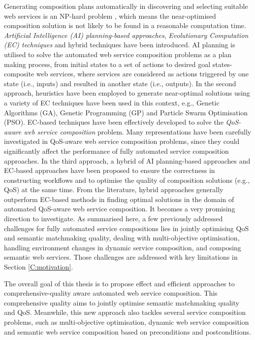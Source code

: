 Generating composition plans automatically in discovering and selecting suitable web services is an NP-hard problem \cite{moghaddam2014service}, which means the near-optimised composition solution is not likely to be found in a reasonable computation time. \emph{Artificial Intelligence (AI) planning-based approaches}, \emph{Evolutionary Computation (EC) techniques} and hybrid techniques have been introduced. AI planning is utilised to solve the automated web service composition problems as a plan making process, from initial states to a set of actions to desired goal states-composite web services, where services are considered as actions triggered by one state (i.e., inputs) and resulted in another state (i.e., outputs). In the second approach, heuristics have been employed to generate near-optimal solutions using a variety of EC techniques have been used in this context, e.g., Genetic Algorithms (GA), Genetic Programming (GP) and Particle Swarm Optimisation (PSO). EC-based techniques have been effectively developed to solve the \emph{QoS-aware web service composition} problem. Many representations have been carefully investigated in QoS-aware web service composition problems, since they could significantly affect the performance of fully automated service composition approaches. In the third approach, a hybrid of AI planning-based approaches and EC-based approaches \cite{da2016genetic,ma2015hybrid} have been proposed to ensure the correctness in constructing workflows and to optimise the quality of composition solutions (e.g., QoS) at the same time. From the literature, hybrid approaches generally outperform EC-based methods in finding optimal solutions in the domain of automated QoS-aware web service composition. It becomes a very promising direction to investigate. As summarised here, a few previously addressed challenges for fully automated service compositions lies in jointly optimising QoS and semantic matchmaking quality, dealing with multi-objective optimisation, handling environment changes in dynamic service composition, and composing semantic web services. Those challenges are addressed with key limitations in Section \ref{C:motivation}. 

The overall goal of this thesis is to propose effect and efficient approaches to comprehensive-quality aware automated web service composition. This comprehensive quality aims to jointly optimise semantic matchmaking quality and QoS. Meanwhile, this new approach also tackles several service composition problems, such as multi-objective optimisation, dynamic web service composition and semantic web service composition based on preconditions and postconditions.

